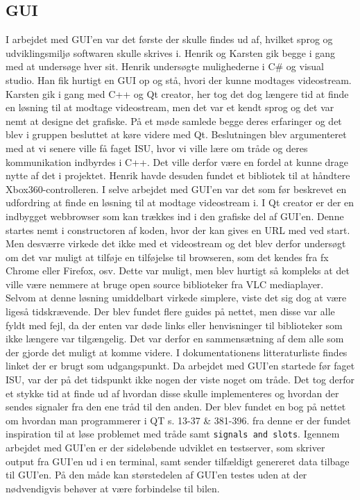 \subsection{GUI}

I arbejdet med GUI’en var det første der skulle findes ud af, hvilket sprog og udviklingsmiljø softwaren skulle skrives i. Henrik og Karsten gik begge i gang med at undersøge hver sit. Henrik undersøgte mulighederne i C\# og visual studio. Han fik hurtigt en GUI op og stå, hvori der kunne modtages videostream. Karsten gik i gang med C++ og Qt creator, her tog det dog længere tid at finde en løsning til at modtage videostream, men det var et kendt sprog og det var nemt at designe det grafiske. På et møde samlede begge deres erfaringer og det blev i gruppen besluttet at køre videre med Qt. Beslutningen blev argumenteret med at vi senere ville få faget ISU, hvor vi ville lære om tråde og deres kommunikation indbyrdes i C++. Det ville derfor være en fordel at kunne drage nytte af det i projektet. Henrik havde desuden fundet et bibliotek til at håndtere Xbox360-controlleren.
I selve arbejdet med GUI’en var det som før beskrevet en udfordring at finde en løsning til at modtage videostream i. I Qt creator er der en indbygget webbrowser som kan trækkes ind i den grafiske del af GUI’en. Denne startes nemt i constructoren af koden, hvor der kan gives en URL med ved start. Men desværre virkede det ikke med et videostream og det blev derfor undersøgt om det var muligt at tilføje en tilføjelse til browseren, som det kendes fra fx Chrome eller Firefox, osv. Dette var muligt, men blev hurtigt så kompleks at det ville være nemmere at bruge open source biblioteker fra VLC mediaplayer. Selvom at denne løsning umiddelbart virkede simplere, viste det sig dog at være ligeså tidskrævende. Der blev fundet flere guides på nettet, men disse var alle fyldt med fejl, da der enten var døde links eller henvisninger til biblioteker som ikke længere var tilgængelig. Det var derfor en sammensætning af dem alle som der gjorde det muligt at komme videre. I dokumentationens litteraturliste findes linket \cite{lib:vlc-using-qt} der er brugt som udgangspunkt. 
Da arbejdet med GUI’en startede før faget ISU, var der på det tidspunkt ikke nogen der viste noget om tråde. Det tog derfor et stykke tid at finde ud af hvordan disse skulle implementeres og hvordan der sendes signaler fra den ene tråd til den anden. Der blev fundet en bog på nettet om hvordan man programmerer i QT \cite{P-lib:qt-bog} s. 13-37 \& 381-396. fra denne er der fundet inspiration til at løse problemet med tråde samt \texttt{signals and slots}. Igennem arbejdet med GUI'en er der sideløbende udviklet en testserver, som skriver output fra GUI'en ud i en terminal, samt sender tilfældigt genereret data tilbage til GUI'en. På den måde kan størstedelen af GUI'en testes uden at der nødvendigvis behøver at være forbindelse til bilen. 
